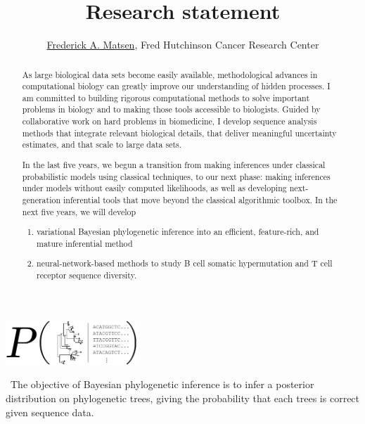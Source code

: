 \documentclass[nobib]{tufte-handout}
\title{Research statement}
\author{\href{http://matsen.fredhutch.org/}{Frederick A. Matsen}, Fred Hutchinson Cancer Research Center}
\begin{document}
\maketitle

\begin{abstract}
\noindent
As large biological data sets become easily available, methodological advances in computational biology can greatly improve our understanding of hidden processes.
I am committed to building rigorous computational methods to solve important problems in biology and to making those tools accessible to biologists.
Guided by collaborative work on hard problems in biomedicine, I develop sequence analysis methods that integrate relevant biological details, that deliver meaningful uncertainty estimates, and that scale to large data sets.


\vspace{0.15cm}

\noindent
In the last five years, we begun a transition from making inferences under classical probabilistic models using classical techniques, to our next phase: making inferences under models without easily computed likelihoods, as well as developing next-generation inferential tools that move beyond the classical algorithmic toolbox.
In the next five years, we will develop
\begin{enumerate}
\item variational Bayesian phylogenetic inference into an efficient, feature-rich, and mature inferential method
\item neural-network-based methods to study B cell somatic hypermutation and T cell receptor sequence diversity.
\end{enumerate}
\end{abstract}

\begin{marginfigure}[0.8in]%
  \includegraphics[width=1.95in]{bayesian_phylo}
  \caption{\
The objective of Bayesian phylogenetic inference is to infer a posterior distribution on phylogenetic trees, giving the probability that each trees is correct given sequence data.
    }
  \label{FIGbayesPhylo}
\end{marginfigure}%


\vspace{0.3cm}
\end{document}

